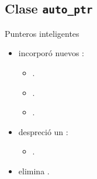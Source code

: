 \subsection{Clase \bf\texttt{auto\_ptr}}

\begin{frame}[t]{Punteros inteligentes}
\begin{itemize}
  \item {} incorporó nuevos :
    \begin{itemize}
      \item {}.
      \item {}.
      \item {}.
    \end{itemize}

  \vfill
  \item {} despreció un :
    \begin{itemize}
      \item {}.
    \end{itemize}

  \vfill\pause
  \item {} elimina .
\end{itemize}
\end{frame}

